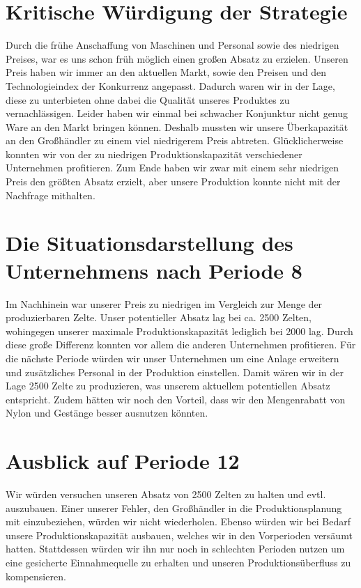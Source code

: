 \documentclass[a4paper, 12pt]{report}
\begin{document}
\begin{flushleft}
% 


\chapter{Kritische Würdigung der Strategie}
Durch die frühe Anschaffung von Maschinen und Personal sowie des niedrigen Preises, war es uns schon früh möglich einen großen Absatz zu erzielen.
Unseren Preis haben wir immer an den aktuellen Markt, sowie den Preisen und den Technologieindex der Konkurrenz angepasst.
Dadurch waren wir in der Lage, diese zu unterbieten ohne dabei die Qualität unseres Produktes zu vernachlässigen.
Leider haben wir einmal bei schwacher Konjunktur nicht genug Ware an den Markt bringen können.
Deshalb mussten wir unsere Überkapazität an den Großhändler zu einem viel niedrigerem Preis abtreten.
Glücklicherweise konnten wir von der zu niedrigen Produktionskapazität verschiedener Unternehmen profitieren.
Zum Ende haben wir zwar mit einem sehr niedrigen Preis den größten Absatz erzielt, aber unsere Produktion konnte nicht mit der Nachfrage mithalten.

\chapter{Die Situationsdarstellung des Unternehmens nach Periode 8}  
Im Nachhinein war unserer Preis zu niedrigen im Vergleich zur Menge der produzierbaren Zelte.
Unser potentieller Absatz lag bei ca. 2500 Zelten, wohingegen unserer maximale Produktionskapazität lediglich bei 2000 lag.
Durch diese große Differenz konnten vor allem die anderen Unternehmen profitieren.
Für die nächste Periode würden wir unser Unternehmen um eine Anlage erweitern und zusätzliches Personal in der Produktion einstellen.
Damit wären wir in der Lage 2500 Zelte zu produzieren, was unserem aktuellem potentiellen Absatz entspricht.
Zudem hätten wir noch den Vorteil, dass wir den Mengenrabatt von Nylon und Gestänge besser ausnutzen könnten.

\chapter{Ausblick auf Periode 12}
Wir würden versuchen unseren Absatz von 2500 Zelten zu halten und evtl. auszubauen.
Einer unserer Fehler, den Großhändler in die Produktionsplanung mit einzubeziehen, würden wir nicht wiederholen.
Ebenso würden wir bei Bedarf unsere Produktionskapazität ausbauen, welches wir in den Vorperioden versäumt hatten.
Stattdessen würden wir ihn nur noch in schlechten Perioden nutzen um eine gesicherte Einnahmequelle zu erhalten und unseren Produktionsüberfluss zu kompensieren.



\end{flushleft}
\end{document}
